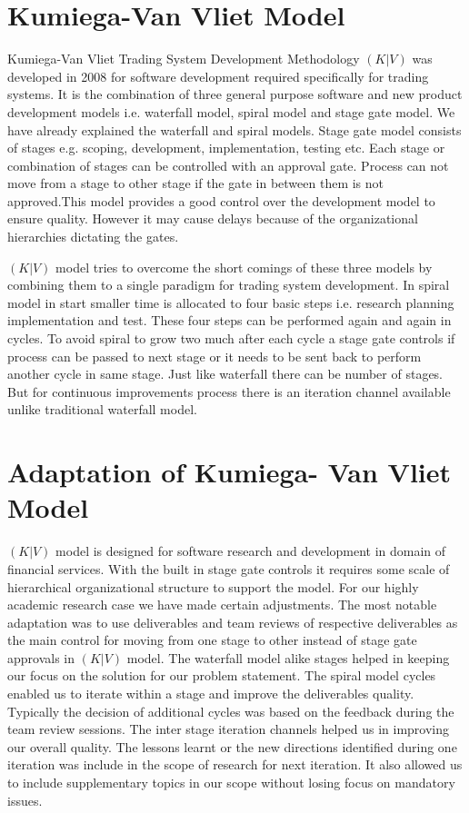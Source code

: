 \section{Kumiega-Van Vliet Model}\label{kvvm}   
      
Kumiega-Van Vliet Trading System Development Methodology \((K|V)\) was developed in 2008 for software development required specifically for trading systems. It is the combination of three general purpose software and new product development models i.e. waterfall model, spiral model and stage gate model. We have already explained the waterfall and spiral models. Stage gate model consists of stages e.g. scoping, development, implementation, testing etc. Each stage or combination of stages can be controlled with an approval gate. Process can not move from a stage to other stage if the gate in between them is not approved.This model provides a good control over the development model to ensure quality. However it may cause delays because of the organizational hierarchies dictating the gates.

 \((K|V)\) model tries to overcome the short comings of these three models by combining them to a single paradigm for trading system development\cite{kumiega2008software}. In spiral model in start smaller time is allocated to four basic steps i.e. research planning implementation and test. These four steps can be performed again and again in cycles. To avoid spiral to grow two much after each cycle a stage gate controls if process can be passed to next stage or it needs to be sent back to perform another cycle in same stage. Just like waterfall there can be number of stages. But for continuous improvements process there is an iteration channel available unlike traditional waterfall model.
 \section{Adaptation of Kumiega- Van Vliet Model}\label{adaptation}
 \((K|V)\) model is designed for software research  and development in domain of financial services. With the built in stage gate controls it requires some scale of hierarchical organizational structure to support the model. For our highly academic research case we have made certain adjustments. The most notable adaptation was to use deliverables and team reviews of respective deliverables as the main control for moving from one stage to other instead of stage gate approvals in \((K|V)\) model. The waterfall model alike stages helped in keeping our focus on the solution for our problem statement. The spiral model cycles enabled us to iterate within a stage and improve the deliverables quality. Typically the decision of additional cycles was based on the feedback during the team review sessions. The inter stage iteration channels helped us in improving our overall quality. The lessons learnt or the new directions identified during one iteration was include in the scope of research for next iteration. It also allowed us to include supplementary topics in our scope without losing focus on mandatory issues.
 
